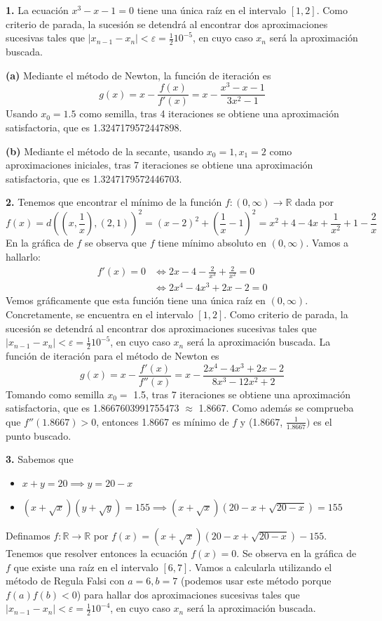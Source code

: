 \documentclass[12pt]{report}
\newcommand{\R}{\mathbb R}
\begin{document}
\textbf{1. } La ecuación $x^3-x-1 = 0$ tiene una única raíz en el intervalo $[1,2]$. Como criterio de parada, la sucesión se detendrá al encontrar dos aproximaciones sucesivas tales que $|x_{n-1} - x_n| < \varepsilon = \frac{1}{2}10^{-5}$, en cuyo caso $x_n$ será la aproximación buscada.

\vspace{2mm}
\textbf{(a) } Mediante el método de Newton, la función de iteración es 
\[g(x) = x - \frac{f(x)}{f'(x)} = x - \frac{x^3-x-1}{3x^2-1}\]
Usando $x_0 = 1.5$ como semilla, tras 4 iteraciones se obtiene una aproximación satisfactoria, que es 1.3247179572447898.

\vspace{2mm}
\textbf{(b) } Mediante el método de la secante, usando $x_0 = 1, x_1 = 2$ como aproximaciones iniciales, tras 7 iteraciones se obtiene una aproximación satisfactoria, que es 1.3247179572446703.

\vspace{6mm}
\textbf{2. } Tenemos que encontrar el mínimo de la función $f: (0,\infty) \to \R$ dada por
\[f(x) = d((x,\frac{1}{x}),(2,1))^2 = (x-2)^2+(\frac{1}{x}-1)^2 = x^2 + 4 -4x + \frac{1}{x^2} + 1 -\frac{2}{x}\]
En la gráfica de $f$ se observa que $f$ tiene mínimo absoluto en $(0,\infty)$. Vamos a hallarlo:
\[
\begin{aligned}
    f'(x) = 0 &\iff 2x -4 -\frac{2}{x^3} + \frac{2}{x^2} = 0 \\
    &\iff 2x^4 - 4x^3 +2x -2 = 0
\end{aligned}
\]
Vemos gráficamente que esta función tiene una única raíz en $(0,\infty)$. Concretamente, se encuentra en el intervalo $[1,2]$. Como criterio de parada, la sucesión se detendrá al encontrar dos aproximaciones sucesivas tales que $|x_{n-1} - x_n| < \varepsilon = \frac{1}{2}10^{-5}$, en cuyo caso $x_n$ será la aproximación buscada. La función de iteración para el método de Newton es 
\[g(x) = x - \frac{f'(x)}{f''(x)} = x - \frac{2x^4 - 4x^3 +2x -2}{8x^3-12x^2+2}\]
Tomando como semilla $x_0 = $ 1.5, tras 7 iteraciones se obtiene una aproximación satisfactoria, que es 1.8667603991755473 $\approx$ 1.8667. Como además se comprueba que $f''(1.8667) > 0$, entonces 1.8667 es mínimo de $f$ y (1.8667, $\frac{1}{1.8667})$ es el punto buscado.

\vspace{6mm}
\textbf{3. } Sabemos que
\begin{itemize}
    \item $x+y=20 \implies y = 20-x$
    \item $(x + \sqrt{x})(y+\sqrt{y})=155 \implies (x+\sqrt{x})(20-x+\sqrt{20-x})=155$
\end{itemize}
Definamos $f \colon \R \to \R$ por $f(x) = (x+\sqrt{x})(20-x+\sqrt{20-x})-155$. Tenemos que resolver entonces la ecuación $f(x) = 0$. Se observa en la gráfica de $f$ que existe una raíz en el intervalo $[6,7]$. Vamos a calcularla utilizando el método de Regula Falsi con $a = 6, b = 7$ (podemos usar este método porque $f(a)f(b)<0$) para hallar dos aproximaciones sucesivas tales que $|x_{n-1} - x_n| < \varepsilon = \frac{1}{2}10^{-4}$, en cuyo caso $x_n$ será la aproximación buscada.
\end{document}
